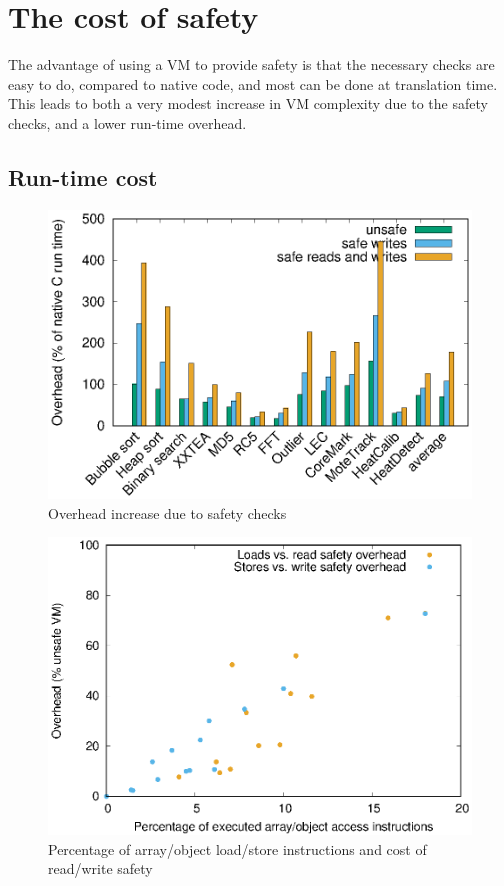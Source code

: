 

\section{The cost of safety}
\label{sec-evaluation-safety}

The advantage of using a VM to provide safety is that the necessary checks are easy to do, compared to native code, and most can be done at translation time. This leads to both a very modest increase in VM complexity due to the safety checks, and a lower run-time overhead. 

\subsection{Run-time cost}
\label{sec-evaluation-run-time-cost}

\begin{figure}
\centering
\includegraphics[width=\mygraphsize]{safety-cost.eps}
\caption{Overhead increase due to safety checks}
\label{fig-safety-cost-per-benchmark}
\end{figure}

\begin{figure}
\centering
\includegraphics[width=\mygraphsize]{safety-ld-st-percentage-vs-overhead.eps}
\caption{Percentage of array/object load/store instructions and cost of read/write safety}
\label{fig-safety-ld-st-percentage-vs-overhead}
\end{figure}

